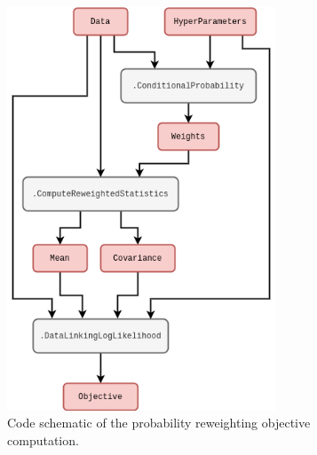 \begin{figure}[h]
\centering
\includegraphics[width=8cm]{images/chapter-2-prob-reweighting-code.drawio.png}
\caption{Code schematic of the probability reweighting objective computation.}
\label{fig:prob-reweighting-code}
\end{figure} 

